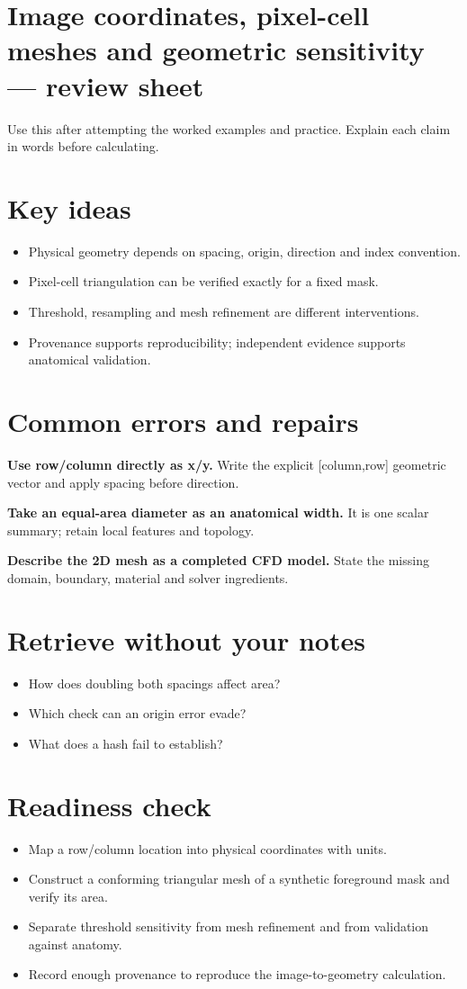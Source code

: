\documentclass[11pt,letterpaper]{article}
\theoremstyle{definition}\newtheorem{definition}{Definition}\newtheorem{example}{Example}
\numberwithin{equation}{section}
\begin{document}
\section*{Image coordinates, pixel-cell meshes and geometric sensitivity --- review sheet}
Use this after attempting the worked examples and practice. Explain each claim in words before calculating.

\section*{Key ideas}
\begin{itemize}
\item Physical geometry depends on spacing, origin, direction and index convention.
\item Pixel-cell triangulation can be verified exactly for a fixed mask.
\item Threshold, resampling and mesh refinement are different interventions.
\item Provenance supports reproducibility; independent evidence supports anatomical validation.
\end{itemize}
\section*{Common errors and repairs}
\textbf{Use row/column directly as x/y.} Write the explicit [column,row] geometric vector and apply spacing before direction.

\textbf{Take an equal-area diameter as an anatomical width.} It is one scalar summary; retain local features and topology.

\textbf{Describe the 2D mesh as a completed CFD model.} State the missing domain, boundary, material and solver ingredients.

\section*{Retrieve without your notes}
\begin{itemize}
\item How does doubling both spacings affect area?
\item Which check can an origin error evade?
\item What does a hash fail to establish?
\end{itemize}
\section*{Readiness check}
\begin{itemize}
\item Map a row/column location into physical coordinates with units.
\item Construct a conforming triangular mesh of a synthetic foreground mask and verify its area.
\item Separate threshold sensitivity from mesh refinement and from validation against anatomy.
\item Record enough provenance to reproduce the image-to-geometry calculation.
\end{itemize}
\end{document}
